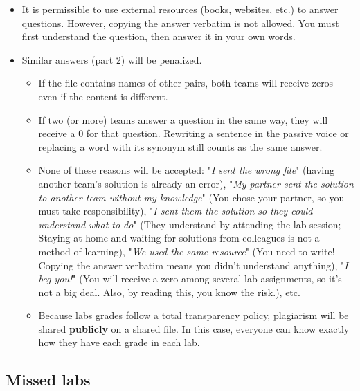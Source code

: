 \documentclass[11pt, a4paper]{article}
\begin{document}
\begin{itemize}
	\item It is permissible to use external resources (books, websites, etc.) to answer questions. 
	However, copying the answer verbatim is not allowed.
	You must first understand the question, then answer it in your own words.
	\item Similar answers (part 2) will be penalized.
	\begin{itemize}
		\item If the file contains names of other pairs, both teams will receive zeros even if the content is different.
		\item If two (or more) teams answer a question in the same way, they will receive a 0 for that question.
		Rewriting a sentence in the passive voice or replacing a word with its synonym still counts as the same answer.
		\item None of these reasons will be accepted: "\textit{I sent the wrong file}" (having another team's solution is already an error), "\textit{My partner sent the solution to another team without my knowledge}" (You chose your partner, so you must take responsibility), "\textit{I sent them the solution so they could understand what to do}" (They understand by attending the lab session; Staying at home and waiting for solutions from colleagues is not a method of learning), "\textit{We used the same resource}" (You need to write! Copying the answer verbatim means you didn't understand anything), "\textit{I beg you!}" (You will receive a zero among several lab assignments, so it's not a big deal. Also, by reading this, you know the risk.), etc.
		\item Because labs grades follow a total transparency policy, plagiarism will be shared \textbf{publicly} on a shared file. 
		In this case, everyone can know exactly how they have each grade in each lab.
	\end{itemize}
\end{itemize}

\subsection{Missed labs}
\end{document}
